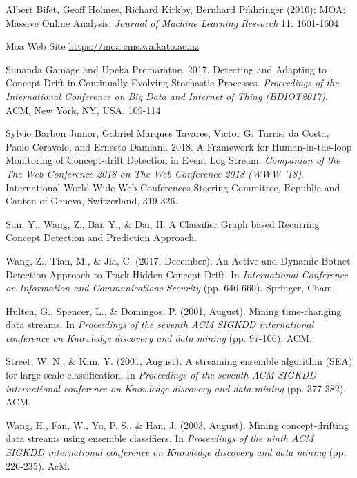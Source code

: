 % 

\begin{thebibliography}{99}


	\emph{} Albert Bifet, Geoff Holmes, Richard Kirkby, Bernhard Pfahringer (2010); MOA: Massive Online Analysis; \textit{Journal of Machine Learning Research} 11: 1601-1604 

	\emph{} Moa Web Site \url{https://moa.cms.waikato.ac.nz}

	\emph{}Sunanda Gamage and Upeka Premaratne. 2017. Detecting and Adapting to Concept Drift in Continually Evolving Stochastic Processes. \textit{Proceedings of the International Conference on Big Data and Internet of Thing (BDIOT2017)}. ACM, New York, NY, USA, 109-114
	
	\emph{}Sylvio Barbon Junior, Gabriel Marques Tavares, Victor G. Turrisi da Costa, Paolo Ceravolo, and Ernesto Damiani. 2018. A Framework for Human-in-the-loop Monitoring of Concept-drift Detection in Event Log Stream. \textit{Companion of the The Web Conference 2018 on The Web Conference 2018 (WWW '18)}. International World Wide Web Conferences Steering Committee, Republic and Canton of Geneva, Switzerland, 319-326.

	\emph{}Sun, Y., Wang, Z., Bai, Y., \& Dai, H. A Classifier Graph based Recurring Concept Detection and Prediction Approach.
	
	\emph{}Wang, Z., Tian, M., \& Jia, C. (2017, December). An Active and Dynamic Botnet Detection Approach to Track Hidden Concept Drift. In \textit{International Conference on Information and Communications Security} (pp. 646-660). Springer, Cham.
	
	\emph{}Hulten, G., Spencer, L., \& Domingos, P. (2001, August). Mining time-changing data streams. In \textit{Proceedings of the seventh ACM SIGKDD international conference on Knowledge discovery and data mining} (pp. 97-106). ACM.	
	
	\emph{}Street, W. N., \& Kim, Y. (2001, August). A streaming ensemble algorithm (SEA) for large-scale classification. In \textit{Proceedings of the seventh ACM SIGKDD international conference on Knowledge discovery and data mining} (pp. 377-382). ACM.	
	
	
	\emph{}Wang, H., Fan, W., Yu, P. S., \& Han, J. (2003, August). Mining concept-drifting data streams using ensemble classifiers. In \textit{Proceedings of the ninth ACM SIGKDD international conference on Knowledge discovery and data mining} (pp. 226-235). AcM.	
		
	
\end{thebibliography}
